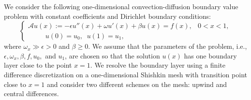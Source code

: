 We consider the following one-dimensional
convection-diffusion boundary value problem with constant coefficients and
Dirichlet boundary conditions:
\begin{equation}\label{eq:1Dbvp}
\begin{cases}
\mathscr{A}u(x):=
-\epsilon  u''(x) + \omega u'(x)+\beta u(x) = f(x), &  0<x<1,\\
            \qquad\;\;u(0)=u_0,\;\;u(1)=u_1, &
\end{cases}
\end{equation}
%
where $\omega_x\gg \epsilon >0$ and $\beta\geq 0$. We assume that the parameters
of the problem, i.e., $\epsilon,\omega_x,\beta,f,u_0,$ and $u_1$, are chosen
so that the solution $u(x)$ has one boundary layer close to the point $x=1$.
We resolve the boundary layer using a finite difference discretization on a
one-dimensional Shishkin mesh with transition point close to $x=1$ and
consider two different schemes on the mesh: upwind and central differences.

